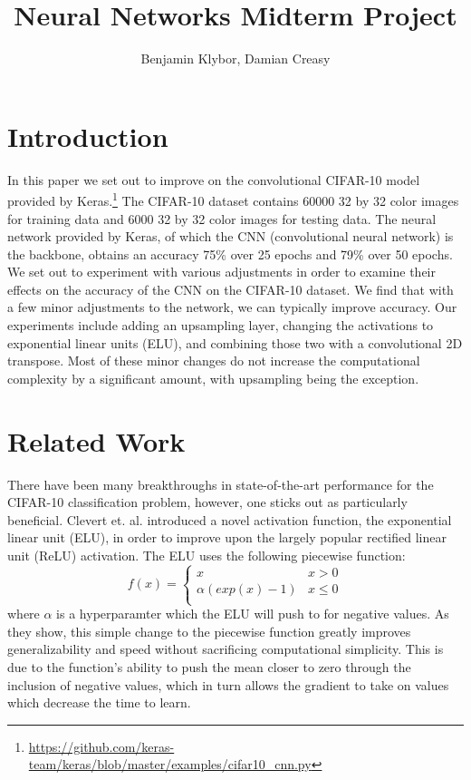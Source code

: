\documentclass{article}
\title{Neural Networks Midterm Project}
\author{Benjamin Klybor, Damian Creasy}
\begin{document}
\maketitle

\section{Introduction}
In this paper we set out to improve on the convolutional CIFAR-10 model provided by Keras.\footnote{\url{https://github.com/keras-team/keras/blob/master/examples/cifar10_cnn.py}} The CIFAR-10 dataset contains 60000 32 by 32 color images for training data and 6000 32 by 32 color images for testing data. The neural network provided by Keras, of which the CNN (convolutional neural network) is the backbone, obtains an accuracy 75\% over 25 epochs and 79\% over 50 epochs. We set out to experiment with various adjustments in order to examine their effects on the accuracy of the CNN on the CIFAR-10 dataset. We find that with a few minor adjustments to the network, we can typically improve accuracy. Our experiments include adding an upsampling layer, changing the activations to exponential linear units (ELU), and combining those two with a convolutional 2D transpose. Most of these minor changes do not increase the computational complexity by a significant amount, with upsampling being the exception. 

\section{Related Work}
There have been many breakthroughs in state-of-the-art performance for the CIFAR-10 classification problem, however, one sticks out as particularly beneficial. Clevert et. al. introduced a novel activation function, the exponential linear unit (ELU), in order to improve upon the largely popular rectified linear unit (ReLU) activation. The ELU uses the following piecewise function:
\[   f(x)=\left\{
\begin{array}{ll}
      x & x > 0 \\
      \alpha (exp(x)-1) & x \leq 0 \\
\end{array} 
\right. \]
where $\alpha$ is a hyperparamter which the ELU will push to for negative values. As they show, this simple change to the piecewise function greatly improves generalizability and speed without sacrificing computational simplicity. This is due to the function's ability to push the mean closer to zero through the inclusion of negative values, which in turn allows the gradient to take on values which decrease the time to learn.
\end{document}
